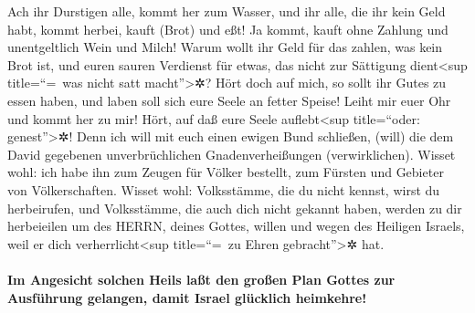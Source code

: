 Ach ihr Durstigen alle, kommt her zum Wasser, und ihr
alle, die ihr kein Geld habt, kommt herbei, kauft (Brot) und eßt! Ja
kommt, kauft ohne Zahlung und unentgeltlich Wein und Milch!
Warum wollt ihr Geld für das zahlen, was kein Brot ist,
und euren sauren Verdienst für etwas, das nicht zur Sättigung
dient\textless sup title=``=~was nicht satt macht''\textgreater✲? Hört
doch auf mich, so sollt ihr Gutes zu essen haben, und laben soll sich
eure Seele an fetter Speise! Leiht mir euer Ohr und kommt
her zu mir! Hört, auf daß eure Seele auflebt\textless sup title=``oder:
genest''\textgreater✲! Denn ich will mit euch einen ewigen Bund
schließen, (will) die dem David gegebenen unverbrüchlichen
Gnadenverheißungen (verwirklichen). Wisset wohl: ich habe
ihn zum Zeugen für Völker bestellt, zum Fürsten und Gebieter von
Völkerschaften. Wisset wohl: Volksstämme, die du nicht
kennst, wirst du herbeirufen, und Volksstämme, die auch dich nicht
gekannt haben, werden zu dir herbeieilen um des HERRN, deines Gottes,
willen und wegen des Heiligen Israels, weil er dich
verherrlicht\textless sup title=``=~zu Ehren gebracht''\textgreater✲
hat.

\hypertarget{im-angesicht-solchen-heils-lauxdft-den-grouxdfen-plan-gottes-zur-ausfuxfchrung-gelangen-damit-israel-gluxfccklich-heimkehre}{%
\paragraph{Im Angesicht solchen Heils laßt den großen Plan Gottes zur
Ausführung gelangen, damit Israel glücklich
heimkehre!}\label{im-angesicht-solchen-heils-lauxdft-den-grouxdfen-plan-gottes-zur-ausfuxfchrung-gelangen-damit-israel-gluxfccklich-heimkehre}}

